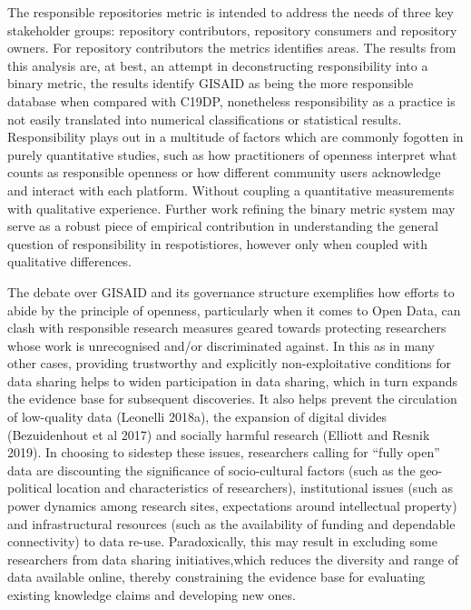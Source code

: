 \documentclass{article}
\begin{document}
The responsible repositories metric is intended to address the needs of
three key stakeholder groups: repository contributors, repository
consumers and repository owners. For repository contributors the metrics
identifies areas. The results from this analysis are, at best, an
attempt in deconstructing responsibility into a binary metric, the
results identify GISAID as being the more responsible database when
compared with C19DP, nonetheless responsibility as a practice is not
easily translated into numerical classifications or statistical results.
Responsibility plays out in a multitude of factors which are commonly
fogotten in purely quantitative studies, such as how practitioners of
openness interpret what counts as responsible openness or how different
community users acknowledge and interact with each platform. Without
coupling a quantitative measurements with qualitative experience.
Further work refining the binary metric system may serve as a robust
piece of empirical contribution in understanding the general question of
responsibility in respotistiores, however only when coupled with
qualitative differences.

The debate over GISAID and its governance structure exemplifies how
efforts to abide by the principle of openness, particularly when it
comes to Open Data, can clash with responsible research measures geared
towards protecting researchers whose work is unrecognised and/or
discriminated against. In this as in many other cases, providing
trustworthy and explicitly non-exploitative conditions for data sharing
helps to widen participation in data sharing, which in turn expands the
evidence base for subsequent discoveries. It also helps prevent the
circulation of low-quality data (Leonelli 2018a), the expansion of
digital divides (Bezuidenhout et al 2017) and socially harmful research
(Elliott and Resnik 2019). In choosing to sidestep these issues,
researchers calling for ``fully open'' data are discounting the
significance of socio-cultural factors (such as the geo-political
location and characteristics of researchers), institutional issues (such
as power dynamics among research sites, expectations around intellectual
property) and infrastructural resources (such as the availability of
funding and dependable connectivity) to data re-use. Paradoxically, this
may result in excluding some researchers from data sharing
initiatives,which reduces the diversity and range of data available
online, thereby constraining the evidence base for evaluating existing
knowledge claims and developing new ones.
\end{document}
